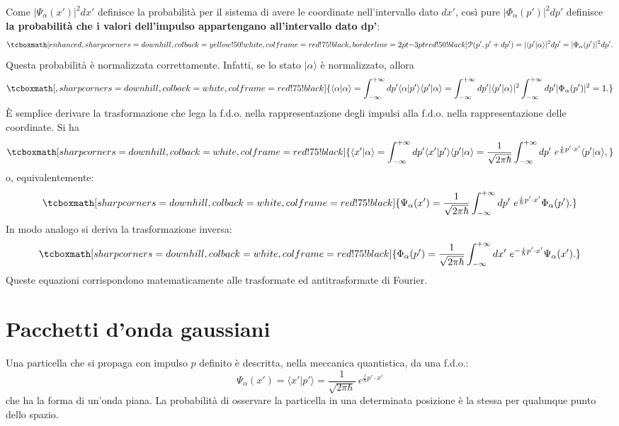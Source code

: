 \documentclass[a4paper,12pt,oneside]{book}
\begin{document}
Come $|\Psi_\alpha (x')|^2 dx'$ definisce la probabilità per il sistema di avere le coordinate nell'intervallo dato $dx'$, così pure $|\Phi_\alpha (p')|^2 dp'$ definisce \textbf{la probabilità che i valori dell'impulso appartengano all'intervallo dato dp'}:
	\begin{equation}
		\tcboxmath[enhanced,sharp corners=downhill ,colback=yellow!50!white,colframe=red!75!black, borderline={2pt}{-3pt}{red!50!black}]{
			\mathcal{P}(p', p'+dp') = |\langle p' | \alpha \rangle|^2 dp' = |\Phi_\alpha (p')|^2 dp'.
			}
	\end{equation}
Questa probabilità è normalizzata correttamente. Infatti, se lo stato $| \alpha \rangle$ è normalizzato, allora
	\begin{equation}
		\tcboxmath[,sharp corners=downhill ,colback=white,colframe=red!75!black]{
			\langle \alpha | \alpha \rangle = \int_{-\infty}^{+\infty} dp' \langle \alpha | p' \rangle \langle p' | \alpha \rangle = \int_{-\infty}^{+\infty} dp' | \langle p' | \alpha \rangle |^2 \int_{-\infty}^{+\infty} dp' |\Phi_\alpha (p')|^2 = 1 .
			}
	\end{equation}
\`E semplice derivare la trasformazione che lega la f.d.o. nella rappresentazione degli impulsi alla f.d.o. nella rappresentazione delle coordinate. Si ha
	\begin{equation}
		\tcboxmath[sharp corners=downhill ,colback=white,colframe=red!75!black]{
			\langle x' | \alpha \rangle = \int_{-\infty}^{+\infty} dp' \langle x' | p' \rangle \langle p' | \alpha \rangle =  \frac{1}{\sqrt{2 \pi \hbar}} \int_{-\infty}^{+\infty} dp' ~ e^{\frac{i}{\hbar}p' \cdot x'} \langle p' | \alpha \rangle ,
			}
	\end{equation}
o, equivalentemente:
	\begin{equation}
		\tcboxmath[sharp corners=downhill ,colback=white,colframe=red!75!black]{
			\Psi_\alpha (x') = \frac{1}{\sqrt{2 \pi \hbar}} \int_{-\infty}^{+\infty} dp' ~ e^{\frac{i}{\hbar}p' \cdot x'} \Phi_\alpha (p').
			}
	\end{equation}
In modo analogo si deriva la trasformazione inversa:
	\begin{equation}
		\tcboxmath[sharp corners=downhill ,colback=white,colframe=red!75!black]{
			\Phi_\alpha (p') = \frac{1}{\sqrt{2 \pi \hbar}} \int_{-\infty}^{+\infty} dx' ~ e^{-\frac{i}{\hbar}p' \cdot x'} \Psi_\alpha (x').
			}
	\end{equation}
Queste equazioni corrispondono matematicamente alle trasformate ed antitrasformate di Fourier.
\section[Pacchetti d'onda gaussiani]{Pacchetti d'onda gaussiani }
Una particella che si propaga con impulso $p$ definito è descritta, nella meccanica quantistica, da una f.d.o.:
	\begin{equation}
		\Psi_\alpha (x') = \langle x' | p' \rangle = \frac{1}{\sqrt{2 \pi \hbar}}~  e^{\frac{i}{\hbar}p' \cdot x'}
	\end{equation}
che ha la forma di un'onda piana. La probabilità di osservare la particella in una determinata posizione è la stessa per qualunque punto dello spazio.\\
\end{document}
